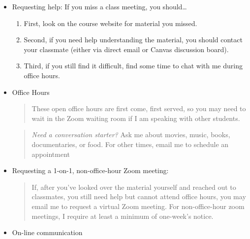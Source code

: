 \documentclass[11pt,]{article}
\providecommand{\tightlist}{%
  \setlength{\itemsep}{0pt}\setlength{\parskip}{0pt}}
\begin{document}
\begin{itemize}
\item
  Requesting help: If you miss a class meeting, you should\ldots{}

  \begin{enumerate}
  \def\labelenumi{\arabic{enumi}.}
  \tightlist
  \item
    First, look on the course website for material you missed.
  \item
    Second, if you need help understanding the material, you should
    contact your classmate (either via direct email or Canvas discussion
    board).
  \item
    Third, if you still find it difficult, find some time to chat with
    me during office hours.
  \end{enumerate}
\item
  Office Hours

  \begin{quote}
  These open office hours are first come, first served, so you may need
  to wait in the Zoom waiting room if I am speaking with other students.
  \end{quote}

  \begin{quote}
  \emph{Need a conversation starter?} Ask me about movies, music, books,
  documentaries, or food. For other times, email me to schedule an
  appointment
  \end{quote}
\item
  Requesting a 1-on-1, non-office-hour Zoom meeting:

  \begin{quote}
  If, after you've looked over the material yourself and reached out to
  classmates, you still need help but cannot attend office hours, you
  may email me to request a virtual Zoom meeting. For non-office-hour
  zoom meetings, I require at least a minimum of one-week's notice.
  \end{quote}
\item
  On-line communication


\end{itemize}
\end{document}
